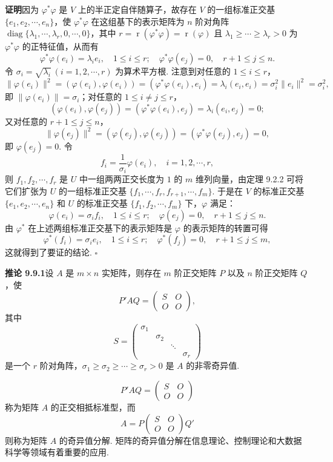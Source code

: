 \documentclass[UTF8, 12pt, fontset=fandol, oneside]{ctexart}
\begin{document}
\noindent\textbf{证明}\quad 因为 $\varphi^*\varphi$ 是 $V$ 上的半正定自伴随算子，故存在 $V$ 的一组标准正交基 $\{e_1,e_2,\cdots,e_n\}$，使 $\varphi^*\varphi$ 在这组基下的表示矩阵为 $n$ 阶对角阵 $\operatorname{diag}\{\lambda_1,\cdots,\lambda_r,0,\cdots,0\}$，其中 $r=\operatorname{r}(\varphi^*\varphi)=\operatorname{r}(\varphi)$ 且 $\lambda_1\ge\cdots\ge\lambda_r>0$ 为 $\varphi^*\varphi$ 的正特征值，从而有
\[
  \varphi^*\varphi(e_i)=\lambda_ie_i,\quad 1\le i\le r;\quad
  \varphi^*\varphi(e_j)=0,\quad r+1\le j\le n.
\]
令 $\sigma_i=\sqrt{\lambda_i}\ (i=1,2,\cdots,r)$ 为算术平方根. 注意到对任意的 $1\le i\le r$，
\[
  \|\varphi(e_i)\|^2=(\varphi(e_i),\varphi(e_i))=(\varphi^*\varphi(e_i),e_i)=\lambda_i(e_i,e_i)=\sigma_i^2\|e_i\|^2=\sigma_i^2,
\]
即 $\|\varphi(e_i)\|=\sigma_i$；对任意的 $1\le i\ne j\le r$，
\[
  (\varphi(e_i),\varphi(e_j))=(\varphi^*\varphi(e_i),e_j)=\lambda_i(e_i,e_j)=0;
\]
又对任意的 $r+1\le j\le n$，
\[
  \|\varphi(e_j)\|^2=(\varphi(e_j),\varphi(e_j))=(\varphi^*\varphi(e_j),e_j)=0,
\]
即 $\varphi(e_j)=0$. 令
\[
  f_i=\frac1{\sigma_i}\varphi(e_i),\quad i=1,2,\cdots,r,
\]
则 $f_1,f_2,\cdots,f_r$ 是 $U$ 中一组两两正交长度为 $1$ 的 $m$ 维列向量，由定理 9.2.2 可将它们扩张为 $U$ 的一组标准正交基 $\{f_1,\cdots,f_r,f_{r+1},\cdots,f_m\}$. 于是在 $V$ 的标准正交基 $\{e_1,e_2,\cdots,e_n\}$ 和 $U$ 的标准正交基 $\{f_1,f_2,\cdots,f_m\}$ 下，$\varphi$ 满足：
\[
  \varphi(e_i)=\sigma_if_i,\quad 1\le i\le r;\quad \varphi(e_j)=0,\quad r+1\le j\le n.
\]
由 $\varphi^*$ 在上述两组标准正交基下的表示矩阵是 $\varphi$ 的表示矩阵的转置可得
\[
  \varphi^*(f_i)=\sigma_ie_i,\quad 1\le i\le r;\quad \varphi^*(f_j)=0,\quad r+1\le j\le m,
\]
这就得到了要证的结论. $\square$

\noindent\textbf{推论 9.9.1}\quad 设 $A$ 是 $m\times n$ 实矩阵，则存在 $m$ 阶正交矩阵 $P$ 以及 $n$ 阶正交矩阵 $Q$，使
\[
  P'AQ=
  \left(\begin{array}{cc}
    S & O\\
    O & O
  \end{array}\right),
\]
其中
\[
  S=
  \left(\begin{array}{cccc}
    \sigma_1 & & &\\
    & \sigma_2 & &\\
    & & \ddots &\\
    & & & \sigma_r
  \end{array}\right)
\]
是一个 $r$ 阶对角阵，$\sigma_1\ge\sigma_2\ge\cdots\ge\sigma_r>0$ 是 $A$ 的非零奇异值.

\[
  P'AQ=
  \left(\begin{array}{cc}
    S & O\\
    O & O
  \end{array}\right)
\]
称为矩阵 $A$ 的正交相抵标准型，而
\[
  A=P
  \left(\begin{array}{cc}
    S & O\\
    O & O
  \end{array}\right)
  Q'
\]
则称为矩阵 $A$ 的奇异值分解. 矩阵的奇异值分解在信息理论、控制理论和大数据科学等领域有着重要的应用.
\end{document}
